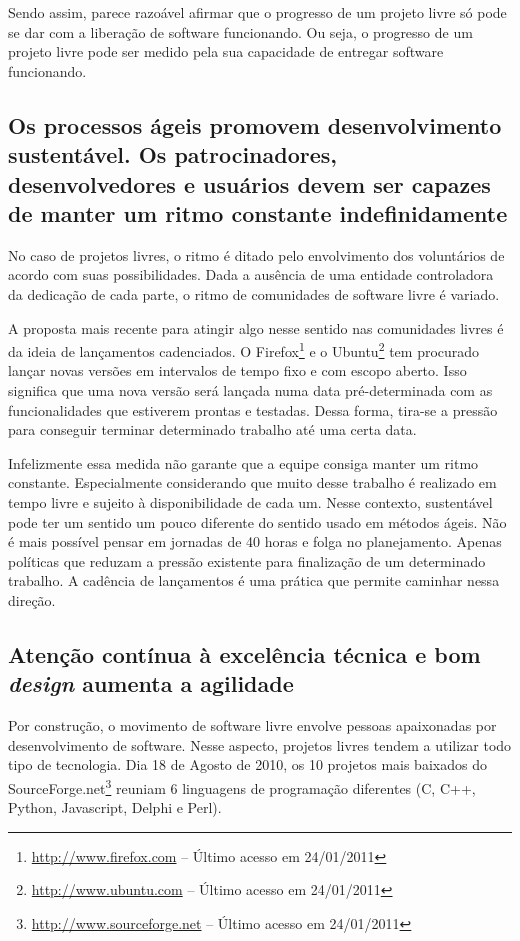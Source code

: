 Sendo assim, parece razoável afirmar que o progresso de um projeto
livre só pode se dar com a liberação de software funcionando. Ou seja,
o progresso de um projeto livre pode ser medido pela sua capacidade de
entregar software funcionando.

\subsection[Ritmo sustentável]{Os processos ágeis promovem
  desenvolvimento sustentável. Os patrocinadores, desenvolvedores e
  usuários devem ser capazes de manter um ritmo constante
  indefinidamente}

No caso de projetos livres, o ritmo é ditado pelo envolvimento dos
voluntários de acordo com suas possibilidades. Dada a ausência de uma
entidade controladora da dedicação de cada parte, o ritmo de
comunidades de software livre é variado.

A proposta mais recente para atingir algo nesse sentido nas
comunidades livres é da ideia de lançamentos cadenciados. O
Firefox\footnote{\url{http://www.firefox.com} -- Último acesso em
    24/01/2011} e o Ubuntu\footnote{\url{http://www.ubuntu.com} --
    Último acesso em 24/01/2011} tem procurado lançar novas versões
em intervalos de tempo fixo e com escopo aberto. Isso significa que
uma nova versão será lançada numa data pré-determinada com as
funcionalidades que estiverem prontas e testadas.  Dessa forma,
tira-se a pressão para conseguir terminar determinado trabalho até uma
certa data.

Infelizmente essa medida não garante que a equipe consiga manter um
ritmo constante. Especialmente considerando que muito desse trabalho é
realizado em tempo livre e sujeito à disponibilidade de cada um. Nesse
contexto, sustentável pode ter um sentido um pouco diferente do
sentido usado em métodos ágeis. Não é mais possível pensar em jornadas
de 40 horas e folga no planejamento. Apenas políticas que reduzam a
pressão existente para finalização de um determinado trabalho. A
cadência de lançamentos é uma prática que permite caminhar nessa
direção.

\subsection[Excelência técnica]{Atenção contínua à excelência técnica
  e bom \textit{design} aumenta a agilidade}

Por construção, o movimento de software livre envolve pessoas
apaixonadas por desenvolvimento de software. Nesse aspecto, projetos
livres tendem a utilizar todo tipo de tecnologia.  Dia 18 de Agosto de
2010, os 10 projetos mais baixados do
SourceForge.net\footnote{\url{http://www.sourceforge.net} -- Último acesso em
    24/01/2011} reuniam 6 linguagens de programação diferentes (C,
C++, Python, Javascript, Delphi e Perl).

